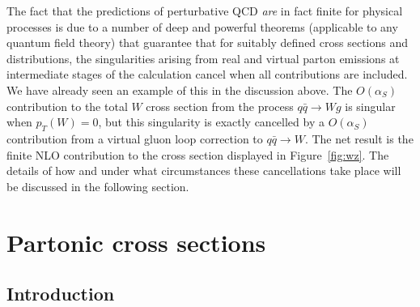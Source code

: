 \documentclass[12pt]{iopart}
\def\as{\alpha_S}
\begin{document}
The fact that the predictions of perturbative QCD {\it are} in fact finite for physical processes is due to a
number of deep and powerful theorems (applicable to any quantum field theory) that guarantee that for suitably
defined cross sections and distributions, the singularities arising from real and virtual parton emissions at
intermediate stages of the calculation cancel when all contributions are included. We have already seen an
example of this in the discussion above. The $O(\as)$ contribution to the total $W$ cross section from the process
$q \bar q \to W g$ is singular when $p_T(W) = 0$, but this singularity is exactly cancelled by a $O(\as)$
contribution from a virtual gluon loop  correction  to $q \bar q \to W$. The net result is the finite NLO
contribution to the cross section displayed in Figure~\ref{fig:wz}.  The details of how and under what
circumstances these cancellations take place will be discussed in the following section.









\section{Partonic cross sections}
\label{sec:partonxsecs}

\subsection{Introduction}
\end{document}
